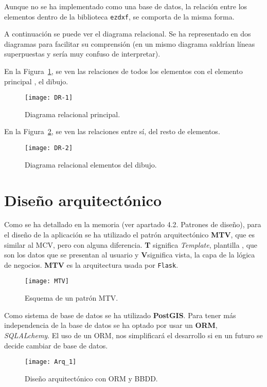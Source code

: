 Aunque no se ha implementado como una base de datos, la relación entre los elementos dentro de la biblioteca \texttt{ezdxf}, se comporta de la misma forma.

A continuación se puede ver el diagrama relacional. Se ha representado en dos diagramas para facilitar su comprensión (en un mismo diagrama saldrían líneas superpuestas y sería muy confuso de interpretar).

En la Figura~\ref{fig:DR-1}, se ven las relaciones de todos los elementos con el elemento principal , el dibujo.

\begin{figure}[H]
	\centering
	\texttt{[image: DR-1]}
	\caption{Diagrama relacional principal.}
	\label{fig:DR-1}
\end{figure}

En la Figura~\ref{fig:DR-2}, se ven las relaciones entre sí, del resto de elementos.

\begin{figure}[H]
	\centering
	\texttt{[image: DR-2]}
	\caption{Diagrama relacional elementos del dibujo.}
	\label{fig:DR-2}
\end{figure}

\section{Diseño arquitectónico}

Como se ha detallado en la memoria (ver apartado 4.2. Patrones de diseño), para el diseño de la aplicación se ha utilizado el patrón arquitectónico \textbf{MTV}, que es similar al MCV, pero con alguna diferencia. \textbf{T} significa \emph{Template}, plantilla , que son los datos que se presentan al usuario y \textbf{V}significa vista, la capa de la lógica de negocios.
\textbf{MTV} es la arquitectura usada por \texttt{Flask}. 

\begin{figure}[H]
	\centering
	\texttt{[image: MTV]}
	\caption{Esquema de un patrón MTV.}
	\label{fig:MTV}
\end{figure}
Como sistema de base de datos se ha utilizado \textbf{PostGIS}. Para tener más independencia de la base de datos se ha optado por usar un \textbf{ORM}, \emph{SQLALchemy}. El uso de un ORM, nos simplificará el desarrollo si en un futuro se decide cambiar de base de datos.


\begin{figure}[H]
	\centering
	\texttt{[image: Arq\_1]}
	\caption{Diseño arquitectónico con ORM y BBDD.}
	\label{fig:Arq_1}
\end{figure}

